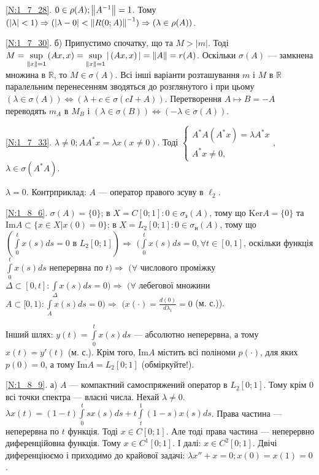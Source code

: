 \noindent\ref{N:1_7_28}. $0 \in \rho(A); \left\lVert A^{-1}\right\rVert = 1$. Тому $(|\lambda| < 1) \Rightarrow (|\lambda - 0| < \left\lVert R(0; A)\right\rVert^{-1}) \Rightarrow (\lambda \in \rho(A))$.

\noindent\ref{N:1_7_30}. б) Припустимо спочатку, що та $M > |m|$. Тоді $M = \sup\limits_{\left\lVert x\right\rVert = 1} \left(Ax, x\right) = \sup\limits_{\left\lVert x\right\rVert = 1} |\left(Ax, x\right)| = \left\lVert A\right\rVert = r(A)$.
Оскільки $\sigma(A)$ --- замкнена множина в $\mathbb{R}$, то $M \in \sigma(A)$.
Всі інші варіанти розташування $m$ і $M$ в $\mathbb{R}$ паралельним перенесенням зводяться до розглянутого і при цьому
$(\lambda \in \sigma(A)) \Leftrightarrow (\lambda + c \in \sigma (cI + A))$. Перетворення $A \mapsto B = -A$ переводять $m_A$ в 
$M_B$ і $(\lambda \in \sigma(B)) \Leftrightarrow (-\lambda \in \sigma(A))$.

\noindent\ref{N:1_7_33}. $\lambda \neq 0; A A^* x = \lambda x (x \neq 0)$. Тоді
$
    \begin{cases}
        A^* A (A^* x) = \lambda A^* x
        \\A^* x \neq 0,
    \end{cases}
$, $\lambda \in \sigma(A^* A)$. 

\noindent $\lambda = 0$. Контрприклад: $A$ --- оператор правого зсуву в $\ell_2$.

\noindent\ref{N:1_8_6}. $\sigma (A) = \{0\}$; в $X = C[0; 1]: 0 \in \sigma_{\text{з}}(A)$, тому що 
$\mathrm{Ker} A = \{0\}$ та $\mathrm{Im} A \subset \{x \in X \big| x(0) = 0\}$;
в $X = L_2 [0; 1]: 0 \in \sigma_{\text{н}} (A)$, тому що $(\int\limits_0^t x(s) ds = 0 \text{ в } L_2[0; 1]) \Rightarrow$
$(\int\limits_0^t x(s) ds = 0, \forall t \in [0, 1]$, оскільки функція $\int\limits_0^t x(s) ds$ неперервна по $t) \Rightarrow$
$(\forall $ числового проміжку $\Delta \subset [0, t]: \int\limits_{\Delta} x(s)ds = 0) \Rightarrow$
$(\forall $ лебегової множини $A \subset [0, 1): \int\limits_A x(s) ds = 0) \Rightarrow$
$(x(\cdot) = \frac{d(0)}{d \lambda_1} = 0$ (м. с.)).

\noindent Інший шлях: $y(t) = \int\limits_0^t x(s) ds$ --- абсолютно неперервна, а тому $x(t) = y'(t)$ (м. с.).
Крім того, $\mathrm{Im} A$ містить всі поліноми $p (\cdot)$, для яких $p(0) = 0$, а тому $\overline{\mathrm{Im}A} = L_2 [0; 1]$
(обміркуйте!).

\noindent\ref{N:1_8_9}. а) $A$ --- компактний самоспряжений оператор в $L_2 [0; 1]$. Тому крім $0$ всі точки спектра --- власні числа.
Нехай $\lambda \neq 0$. $\lambda x(t) = (1-t)\int\limits_0^t s x(s) ds + t \int\limits_t^1 (1-s) x(s) ds$. Права частина --- неперервна
по $t$ функція. Тоді $x \in C[0;1]$. Але тоді права частина --- неперервно диференційовна функція. Тому $x \in C^1 [0; 1]$. І далі: $x \in C^2 [0; 1]$.
Двічі диференціюємо і приходимо до крайової задачі: $\lambda x'' + x = 0; x(0) = x(1) = 0$.

